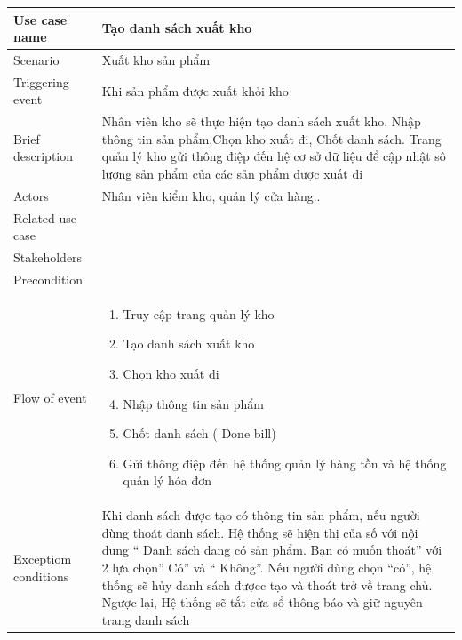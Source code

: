 \documentclass{article}
\begin{document}
\begin{tabular}{|m{4cm}|m{12cm}|}
		\hline
		Use case name & Tạo danh sách xuất kho \\
		\hline
		Scenario & Xuất kho sản phẩm \\
		\hline
		Triggering event & Khi sản phẩm được xuất khỏi kho \\
		\hline
		Brief description & Nhân viên kho sẽ thực hiện tạo danh sách xuất kho. Nhập thông tin sản phẩm,Chọn kho xuất đi, Chốt danh sách. Trang quản lý kho gửi thông điệp đến hệ cơ sở dữ liệu để cập nhật sô lượng sản phẩm của các sản phẩm được xuất đi \\
		\hline
		 Actors & Nhân viên kiểm kho, quản lý cửa hàng..\\
		\hline
		Related use case &  \\
		\hline
		Stakeholders & \\
		\hline
		Precondition &\\
		\hline
		Flow of event & \begin{enumerate}
		    \item	Truy cập trang quản lý kho
        	\item Tạo danh sách xuất kho
            \item Chọn kho xuất đi 
            \item Nhập thông tin sản phẩm
            \item Chốt danh sách ( Done bill)
	       \item Gửi thông điệp đến hệ thống quản lý hàng tồn và hệ thống quản lý hóa đơn
	    \end{enumerate}  \\
		\hline
		Exceptiom conditions &	Khi danh sách được tạo có thông tin sản phẩm, nếu người dùng thoát danh sách. Hệ thống sẽ hiện thị của số với nội dung “ Danh sách đang có sản phẩm. Bạn có muốn thoát” với 2 lựa chọn” Có” và “ Không”. Nếu người dùng chọn  “có”, hệ thống sẽ hủy danh sách đượcc tạo và thoát trở về trang chủ. Ngược lại, Hệ thống sẽ tắt cửa sổ thông báo và giữ nguyên trang danh sách \\
		\hline
\end{tabular}
\end{document}
